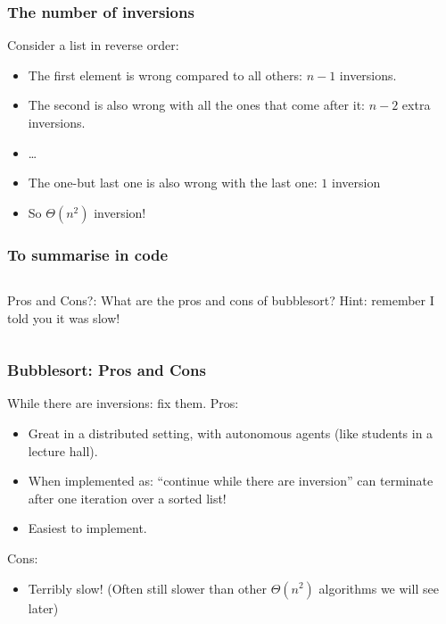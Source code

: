 \begin{frame}
	\frametitle{The number of inversions}

		Consider a list in reverse order:
		\begin{itemize}
			\item The first element is wrong compared to all others: $n-1$ inversions.
		
			\item The second is also wrong with all the ones that come after it: $n-2$ extra inversions.
			\item \ldots
		
			\item The one-but last one is also wrong with the last one: $1$ inversion
		
			\item So $\Theta(n^2)$ inversion!
		\end{itemize}
\end{frame}

\begin{frame}
	\frametitle{To summarise in code}
	\begin{columns}[T]
	
Pros and Cons?:
			What are the pros and cons of bubblesort? Hint: remember I told you it was slow!
	\end{columns}
\end{frame}

\begin{frame}
	\frametitle{Bubblesort: Pros and Cons}

			While there are inversions: fix them.
Pros:
			\begin{itemize}
				\item Great in a distributed setting, with autonomous agents (like students in a lecture hall).
				\item When implemented as: ``continue while there are inversion'' can terminate after one iteration over a
					sorted list! 
				\item Easiest to implement.
			\end{itemize}


Cons:
			\begin{itemize}
				\item Terribly slow! (Often still slower than other $\Theta(n^2)$ algorithms we will see later)
			\end{itemize}
\end{frame}

